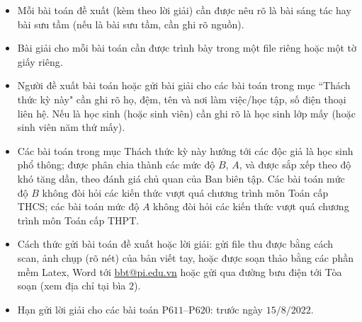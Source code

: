 \thispagestyle{thachthuctoanhocnone}
\pagestyle{thachthuctoanhoc}
\everymath{\color{thachthuctoanhoc}}
\graphicspath{{../thachthuctoanhoc/pic/}}
\begingroup
{}
\centering
\vspace*{4cm}
\endgroup
\vspace*{-8pt}
\begin{tBox}
	\begin{itemize}[leftmargin = 13pt, itemsep = 1.0pt] 
		\item Mỗi bài toán đề xuất (kèm theo lời giải) cần được nêu rõ là bài sáng tác hay bài sưu tầm (nếu là bài sưu tầm, cần ghi rõ nguồn).
		\item Bài giải cho mỗi bài toán cần được trình bày trong một file riêng hoặc
		một tờ giấy riêng.
		\item  Người đề xuất bài toán hoặc gửi bài giải cho các bài toán trong mục ``Thách thức kỳ này" cần ghi rõ họ, đệm, tên và nơi làm việc/học tập, số điện thoại liên hệ. Nếu là học sinh (hoặc sinh viên) cần ghi rõ là học sinh lớp mấy (hoặc sinh viên năm thứ mấy).
		\item Các bài toán trong mục Thách thức kỳ này hướng tới các độc giả là học sinh phổ thông; được phân chia thành các mức độ $B$, $A$, và được sắp xếp theo độ khó tăng dần, theo đánh giá chủ quan của Ban biên tập. Các bài toán mức độ $B$ không đòi hỏi các kiến thức vượt quá chương trình môn Toán cấp THCS; các bài toán mức độ $A$ không đòi hỏi các kiến thức vượt quá chương trình môn Toán cấp THPT.
		\item Cách thức gửi bài toán đề xuất hoặc lời giải: gửi file thu được bằng cách scan, ảnh chụp (rõ nét) của bản viết tay, hoặc được soạn thảo bằng các phần mềm Latex, Word tới \url{bbt@pi.edu.vn} hoặc gửi qua đường bưu điện tới Tòa soạn (xem địa chỉ tại bìa $2$).
		\item Hạn gửi lời giải cho các bài toán P$611$--P$620$: trước ngày $15/8/2022$.
	\end{itemize}
\end{tBox}
